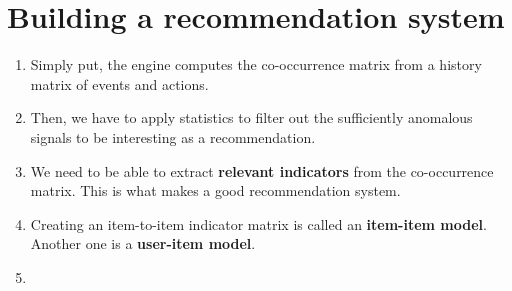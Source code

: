 \documentclass[12pt,a4paper]{article}
\begin{document}
\section*{Building a recommendation system}
\begin{enumerate}
  \item Simply put, the engine computes the co-occurrence matrix
        from a history matrix of events and actions. 
  \item Then, we have to apply statistics to filter out the 
        sufficiently anomalous signals to be interesting as a 
        recommendation.
  \item We need to be able to extract \textbf{relevant indicators} 
        from the co-occurrence matrix. This is what makes a good 
        recommendation system.
  \item Creating an item-to-item indicator matrix is called an 
        \textbf{item-item model}. Another one is a \textbf{user-item model}.
  \item   
\end{enumerate}
\end{document}
